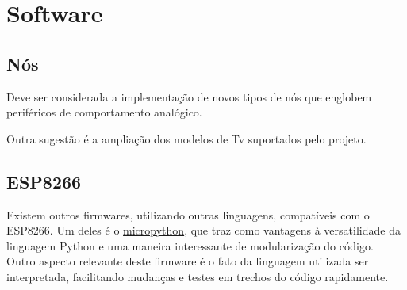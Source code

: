 \documentclass[
12pt,				%
openany,			%
twoside,			%
a4paper,			%
english,			%
french,				%
spanish,			%
brazil,				%
]{abntex2}
\begin{document}
\chapter{Software}

\section{Nós}
Deve ser considerada a implementação de novos tipos de nós que englobem periféricos de comportamento analógico.

Outra sugestão é a ampliação dos modelos de Tv suportados pelo projeto.

\section{ESP8266}
Existem outros firmwares, utilizando outras linguagens, compatíveis com o ESP8266. Um deles é o \href{https://micropython.org/]}{micropython}, que traz como vantagens à versatilidade da linguagem Python e uma maneira interessante de modularização do código. Outro aspecto relevante deste firmware é o fato da linguagem utilizada ser interpretada, facilitando mudanças e testes em trechos do código rapidamente.



\postextual



%
%


\end{document}
